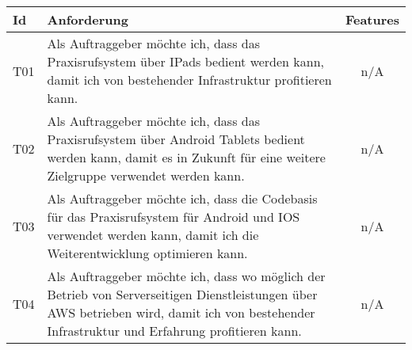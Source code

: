 \begin{table}[h]
    \centering
    \begin{tabular}{|l|p{13cm}|c|}
        \hline
        \textbf{Id} & \textbf{Anforderung}                                                                                                                                                                          & \textbf{Features} \\
        \hline
        T01         & Als Auftraggeber möchte ich, dass das Praxisrufsystem über IPads bedient werden kann, damit ich von bestehender Infrastruktur profitieren kann. & n/A \\
        \hline
        T02         & Als Auftraggeber möchte ich, dass das Praxisrufsystem über Android Tablets bedient werden kann, damit es in Zukunft für eine weitere Zielgruppe verwendet werden kann. & n/A \\
        \hline
        T03         & Als Auftraggeber möchte ich, dass die Codebasis für das Praxisrufsystem für Android und IOS verwendet werden kann, damit ich die Weiterentwicklung optimieren kann. & n/A \\
        \hline
        T04         & Als Auftraggeber möchte ich, dass wo möglich der Betrieb von Serverseitigen Dienstleistungen über AWS betrieben wird, damit ich von bestehender Infrastruktur und Erfahrung profitieren kann. & n/A               \\
        \hline
    \end{tabular}\label{tab:userstories3}
\end{table}

\clearpage

